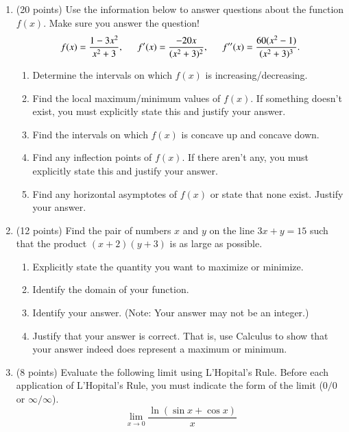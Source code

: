 \documentclass[12pt]{article}
\begin{document}
\begin{enumerate}
\newpage
\item (20 points) Use the information below to answer questions about the function $f(x).$ Make sure you answer the question!  \\
$$f(x)=\frac{1-3x^2}{x^2+3}, \hspace{.2in} f'(x)=\frac{-20x}{(x^2+3)^2},
\hspace{.2in} f''(x)=\frac{60(x^2-1)}{(x^2+3)^3}.$$

\begin{enumerate}
\item  Determine the intervals on which $f(x)$ is increasing/decreasing.
\vfill
\item Find the local maximum/minimum values of $f(x)$. If something doesn't exist, you must explicitly state this and justify your answer.
\vfill
\item Find the intervals on which $f(x)$ is concave up and concave down.
\vfill 
\item Find any inflection points of $f(x).$ If there aren't any, you must explicitly state this and justify your answer.
\vfill
\item Find any horizontal asymptotes of $f(x)$ or state that none exist. Justify your answer.
\vfill
\end{enumerate}
\newpage
\item (12 points) Find the pair of numbers $x$ and $y$ on the line $3x+y=15$ such that the product $(x+2)(y+3)$ is as large as possible. 
	\begin{enumerate}
	\item Explicitly state the quantity you want to maximize or minimize.
	\item Identify the domain of your function.
	\item Identify your answer. (Note: Your answer may not be an integer.)
	\item Justify that your answer is correct. That is, use Calculus to show that your answer indeed does represent a maximum or minimum.
	\end{enumerate}
\newpage

\item  (8 points) Evaluate the following limit using L'Hopital's Rule. Before each application of L'Hopital's Rule, you must indicate the form of the limit ($0/0$ or $\infty/\infty$).\\
\vspace{.2in}
$$\lim_{x \rightarrow 0}\frac{\ln(\sin x + \cos x)}{x}$$


\end{enumerate}
\end{document}
